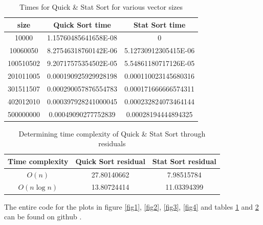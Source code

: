 \documentclass[12pt]{article}
\begin{document}
		\begin{table}
		\caption{Times for Quick \& Stat Sort for various vector sizes}
		\begin{center}
		\begin{tabular}{ |c|c|c| }
		
		\hline
		
		size & Quick Sort time & Stat Sort time \\

		\hline\hline		
		
		10000		& 1.15760485641658E-08	& 0 \\
		10060050		& 8.27546318760142E-06	& 5.12730912305415E-06 \\
		100510502	& 9.20717575354502E-05	& 5.54861180717126E-05 \\
		201011005	& 0.000190925929928198	& 0.000110023145680316 \\
		301511507	& 0.000290057876554783	& 0.000171666666574311 \\
		402012010	& 0.000397928241000045	& 0.000232824073464144 \\
		500000000	& 0.00049090277752839	& 0.00028194444894325 \\

		\hline
		\end{tabular}
		\end{center}
		\label{table1}
		\end{table}


		\begin{table}
		\caption{Determining time complexity of Quick \& Stat Sort through residuals}
		\begin{center}
		\begin{tabular}{ |c|c|c| }
		\hline
		
		Time complexity & Quick Sort residual & Stat Sort residual \\

		\hline\hline		
		
		$O(n)$ &		27.80140662 &  7.98515784  \\
		$O(n \log n)$ & 13.80724414		& 11.03394399 \\

		\hline
		\end{tabular}
		\end{center}
		\label{table2}
		\end{table}

		
		The entire code for the plots in figure \ref{fig1}, \ref{fig2}, \ref{fig3}, \ref{fig4} and tables \ref{table1} and \ref{table2} can be found on github \cite{peta78}.
		
\end{document}
